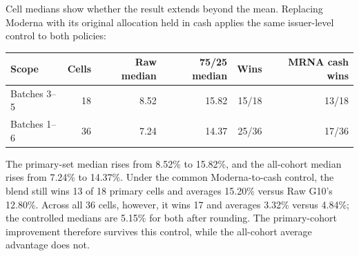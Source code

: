 Cell medians show whether the result extends beyond the mean. Replacing
Moderna with its original allocation held in cash applies the same
issuer-level control to both policies:

\begin{minipage}{\linewidth}
\begin{center}\small\setlength{\tabcolsep}{4pt}\renewcommand{\arraystretch}{1.18}
\begin{longtable}{@{}lrrrrr@{}}\toprule
Scope & Cells & Raw median & 75/25 median & Wins & MRNA cash wins\\\midrule\endhead
Batches 3--5 & 18 & 8.52 & 15.82 & 15/18 & 13/18\\
Batches 1--6 & 36 & 7.24 & 14.37 & 25/36 & 17/36\\
\bottomrule\end{longtable}\end{center}
\end{minipage}\par

The primary-set median rises from 8.52\% to 15.82\%, and the all-cohort
median rises from 7.24\% to 14.37\%. Under the common Moderna-to-cash
control, the blend still wins 13 of 18 primary cells and averages
15.20\% versus Raw G10's 12.80\%. Across all 36 cells, however, it wins
17 and averages 3.32\% versus 4.84\%; the controlled medians are
5.15\% for both after rounding. The primary-cohort improvement therefore
survives this control, while the all-cohort average advantage does not.
